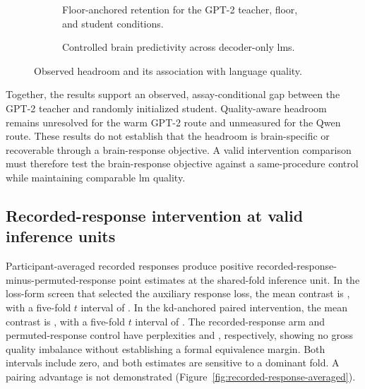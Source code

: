 \begin{figure}[tbp]
  \centering
  \begin{subfigure}[t]{\textwidth}
    \centering
    \resizebox{\linewidth}{!}{}
    \par\vspace{0.45em}
    \caption{Floor-anchored retention for the GPT-2 teacher, floor, and student conditions.}
    \label{fig:distillation-headroom-retention}
  \end{subfigure}
  \par\smallskip
  \begin{subfigure}[t]{\textwidth}
    \centering
    \resizebox{\linewidth}{!}{}
    \par\vspace{0.45em}
    \caption{Controlled brain predictivity across  decoder-only \acp{lm}.}
    \label{fig:distillation-headroom-quality}
  \end{subfigure}
  \caption{Observed headroom and its association with language quality.}
  \label{fig:distillation-headroom-quality-results}
\end{figure}

Together, the results support an observed, assay-conditional gap between the GPT-2 teacher and randomly initialized student.
Quality-aware headroom remains unresolved for the warm GPT-2 route and unmeasured for the Qwen route.
These results do not establish that the headroom is brain-specific or recoverable through a brain-response objective.
A valid intervention comparison must therefore test the brain-response objective against a same-procedure control while maintaining comparable \ac{lm} quality.

\subsection{Recorded-response intervention at valid inference units}
\label{sec:results-recorded}

Participant-averaged recorded responses produce positive recorded-response-minus-permuted-response point estimates at the shared-fold inference unit.
In the loss-form screen that selected the auxiliary response loss, the mean contrast is , with a five-fold \(t\) interval of .
In the \ac{kd}-anchored paired intervention, the mean contrast is , with a five-fold \(t\) interval of .
The recorded-response arm and permuted-response control have perplexities  and , respectively, showing no gross quality imbalance without establishing a formal equivalence margin.
Both intervals include zero, and both estimates are sensitive to a dominant fold.
A pairing advantage is not demonstrated (Figure~\ref{fig:recorded-response-averaged}).

